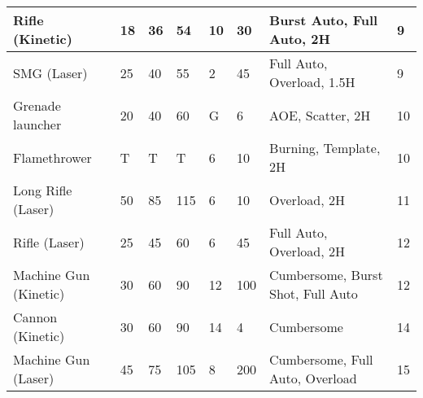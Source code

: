 \begin{table}[H]
\begin{tabular}{|l|l|l|l|l|l|l|l|}
        Rifle (Kinetic)       & 18                                                      & 36                                                      & 54                                                      & 10   & 30  & Burst Auto, Full Auto, 2H         & 9   \\ \hline
        SMG (Laser)           & 25                                                      & 40                                                      & 55                                                      & 2    & 45  & Full Auto, Overload, 1.5H         & 9   \\ \hline
        Grenade launcher      & 20                                                      & 40                                                      & 60                                                      & G    & 6   & AOE, Scatter, 2H                  & 10  \\ \hline
        Flamethrower          & T                                                       & T                                                       & T                                                       & 6    & 10  & Burning, Template, 2H             & 10  \\ \hline
        Long Rifle (Laser)    & 50                                                      & 85                                                      & 115                                                     & 6    & 10  & Overload, 2H                      & 11  \\ \hline
        Rifle (Laser)         & 25                                                      & 45                                                      & 60                                                      & 6    & 45  & Full Auto, Overload, 2H           & 12  \\ \hline
        Machine Gun (Kinetic) & 30                                                      & 60                                                      & 90                                                      & 12   & 100 & Cumbersome, Burst Shot, Full Auto & 12  \\ \hline
        Cannon (Kinetic)      & 30                                                      & 60                                                      & 90                                                      & 14   & 4   & Cumbersome                        & 14  \\ \hline
        Machine Gun (Laser)   & 45                                                      & 75                                                      & 105                                                     & 8    & 200 & Cumbersome, Full Auto, Overload   & 15  \\ \hline

\end{tabular}
\end{table}
